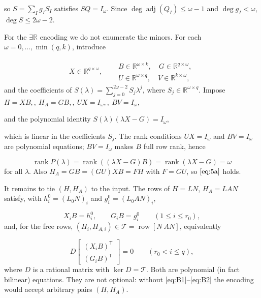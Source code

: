 \documentclass[journal]{IEEEtran}
\theoremstyle{plainn}
\begin{document}
so $S=\sum_I g_I S_I$ satisfies $SQ=I_\omega$. Since $\deg\operatorname{adj}(Q_I)\le\omega-1$ and $\deg g_I<\omega$, $\deg S\le2\omega-2$.

For the $\exists\mathbb R$ encoding we do not enumerate the minors. For each $\omega=0,\dots,\min(q,k)$, introduce

\begin{equation}
\begin{gathered}
X\in\mathbb R^{q\times\omega},\quad
\begin{aligned}
&B\in\mathbb R^{\omega\times k},\quad G\in\mathbb R^{q\times\omega},\\
&U\in\mathbb R^{\omega\times q},\quad V\in\mathbb R^{k\times\omega},
\end{aligned}
\end{gathered}
\end{equation}
and the coefficients of $S(\lambda)=\sum_{j=0}^{2\omega-2}S_j\lambda^j$, where $S_j\in\mathbb R^{\omega\times q}$. Impose $H=XB,,\  H_A=GB,,\  UX=I_\omega,,\  BV=I_\omega$,

and the polynomial identity $S(\lambda)(\lambda X-G)=I_\omega$,

which is linear in the coefficients $S_j$. The rank conditions $UX=I_\omega$ and $BV=I_\omega$ are polynomial equations; $BV=I_\omega$ makes $B$ full row rank, hence

\begin{equation}
\operatorname{rank}P(\lambda)=\operatorname{rank}((\lambda X-G)B)
=\operatorname{rank}(\lambda X-G)=\omega
\end{equation}
for all $\lambda$. Also $H_A=GB=(GU)XB=FH$ with $F=GU$, so $\eqref{eq:5a}$ holds.

It remains to tie $(H,H_A)$ to the input. The rows of $H=LN$, $H_A=LAN$ satisfy, with $h_i^0=(L_0N)_i$ and $g_i^0=(L_0AN)_i$,

\begin{equation}
X_iB=h_i^0,\qquad G_iB=g_i^0\qquad(1\le i\le r_0),
\tag{B.1}\label{eq:B1}
\end{equation}
and, for the free rows, $(H_i,H_{A,i})\in\mathcal T=\operatorname{row}[N\ AN]$, equivalently

\begin{equation}
D\begin{bmatrix}(X_iB)^{\mathsf T}\\ (G_iB)^{\mathsf T}\end{bmatrix}=0
\qquad(r_0<i\le q),
\tag{B.2}\label{eq:B2}
\end{equation}
where $D$ is a rational matrix with $\ker D=\mathcal T$. Both are polynomial (in fact bilinear) equations. They are not optional: without \eqref{eq:B1}--\eqref{eq:B2} the encoding would accept arbitrary pairs $(H,H_A)$.
\end{document}
